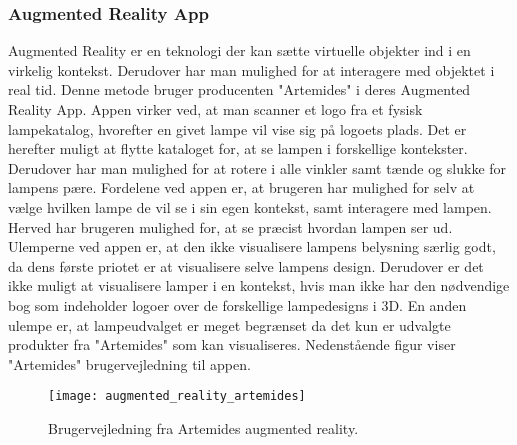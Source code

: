 \subsubsection{Augmented Reality App}
Augmented Reality er en teknologi der kan sætte virtuelle objekter ind i en virkelig kontekst. Derudover har man mulighed for at interagere med objektet i real tid. 
Denne metode bruger producenten "Artemides" i deres Augmented Reality App. Appen virker ved, at man scanner et logo fra et fysisk lampekatalog, hvorefter en givet lampe vil vise sig på logoets plads. Det er herefter muligt at flytte kataloget for, at se lampen i forskellige kontekster. Derudover har man mulighed for at rotere i alle vinkler samt tænde og slukke for lampens pære. 
Fordelene ved appen er, at brugeren har mulighed for selv at vælge hvilken lampe de vil se i sin egen kontekst, samt interagere med lampen. Herved har brugeren mulighed for, at se præcist hvordan lampen ser ud. 
Ulemperne ved appen er, at den ikke visualisere lampens belysning særlig godt, da dens første priotet er at visualisere selve lampens design. Derudover er det ikke muligt at visualisere lamper i en kontekst, hvis man ikke har den nødvendige bog som indeholder logoer over de forskellige lampedesigns i 3D. En anden ulempe er, at lampeudvalget er meget begrænset da det kun er udvalgte produkter fra "Artemides" som kan visualiseres. 
Nedenstående figur viser "Artemides" brugervejledning til appen.

\begin{figure}[H]
    \centering
    \texttt{[image: augmented\_reality\_artemides]}
    \caption{Brugervejledning fra Artemides augmented reality.}
    \label{fig:augmented_reality_artemides}
\end{figure} 
